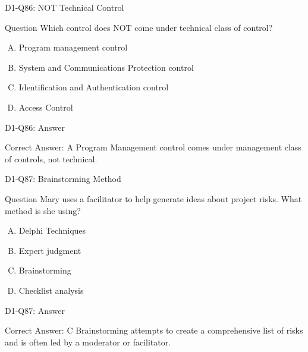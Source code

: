 \documentclass{beamer}
\begin{document}
	\begin{frame}{D1-Q86: NOT Technical Control}
		\begin{block}{Question}
			Which control does NOT come under technical class of control?
		\end{block}
		\begin{enumerate}[(A)]
			\item Program management control
			\item System and Communications Protection control
			\item Identification and Authentication control
			\item Access Control
		\end{enumerate}
	\end{frame}
	\begin{frame}{D1-Q86: Answer}
		\begin{block}{Correct Answer: A}
			Program Management control comes under management class of controls, not technical.
		\end{block}
	\end{frame}
	
	\begin{frame}{D1-Q87: Brainstorming Method}
		\begin{block}{Question}
			Mary uses a facilitator to help generate ideas about project risks. What method is she using?
		\end{block}
		\begin{enumerate}[(A)]
			\item Delphi Techniques
			\item Expert judgment
			\item Brainstorming
			\item Checklist analysis
		\end{enumerate}
	\end{frame}
	\begin{frame}{D1-Q87: Answer}
		\begin{block}{Correct Answer: C}
			Brainstorming attempts to create a comprehensive list of risks and is often led by a moderator or facilitator.
		\end{block}
	\end{frame}
	
\end{document}
